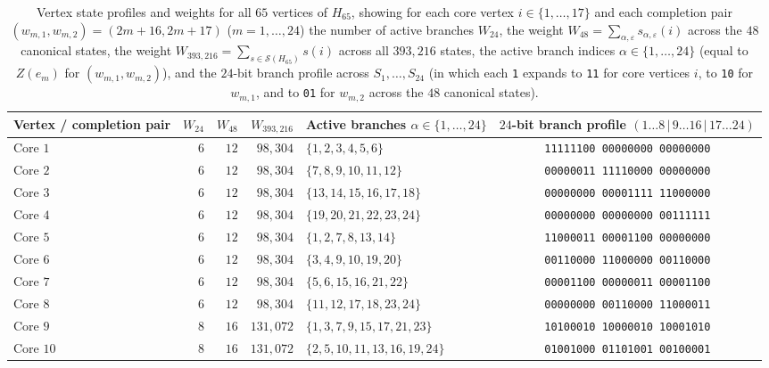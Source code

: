 \documentclass[
  aps,
  pra,
  reprint,
  superscriptaddress,
  amsmath,
  amssymb,
  nofootinbib,
  floatfix
]{revtex4-2}
\theoremstyle{definition}
\theoremstyle{remark}
\begin{document}
\begin{table}[t]
\caption{Vertex state profiles and weights for all $65$ vertices of $H_{65}$, showing for each core vertex $i\in\{1,\ldots,17\}$ and each completion pair $(w_{m,1},w_{m,2})=(2m+16,2m+17)$ ($m=1,\ldots,24$) the number of active branches $W_{24}$, the weight $W_{48}=\sum_{\alpha,\varepsilon}s_{\alpha,\varepsilon}(i)$ across the $48$ canonical states, the weight $W_{393{,}216}=\sum_{s\in\mathcal{S}(H_{65})}s(i)$ across all $393{,}216$ states, the active branch indices $\alpha\in\{1,\ldots,24\}$ (equal to $Z(e_m)$ for $(w_{m,1},w_{m,2})$), and the $24$-bit branch profile across $S_1,\ldots,S_{24}$ (in which each \texttt{1} expands to \texttt{11} for core vertices $i$, to \texttt{10} for $w_{m,1}$, and to \texttt{01} for $w_{m,2}$ across the $48$ canonical states).}\label{tab:app-h65-vertex-profiles}
\scriptsize
\begin{ruledtabular}
\begin{tabular}{lrrrlc}
Vertex / completion pair & $W_{24}$ & $W_{48}$ & $W_{393{,}216}$ & Active branches $\alpha\in\{1,\ldots,24\}$ & $24$-bit branch profile $(1\ldots 8\,|\,9\ldots 16\,|\,17\ldots 24)$ \\ \hline
Core $1$ & $6$ & $12$ & $98{,}304$ & $\{1,2,3,4,5,6\}$ & \texttt{11111100\,00000000\,00000000} \\
Core $2$ & $6$ & $12$ & $98{,}304$ & $\{7,8,9,10,11,12\}$ & \texttt{00000011\,11110000\,00000000} \\
Core $3$ & $6$ & $12$ & $98{,}304$ & $\{13,14,15,16,17,18\}$ & \texttt{00000000\,00001111\,11000000} \\
Core $4$ & $6$ & $12$ & $98{,}304$ & $\{19,20,21,22,23,24\}$ & \texttt{00000000\,00000000\,00111111} \\
Core $5$ & $6$ & $12$ & $98{,}304$ & $\{1,2,7,8,13,14\}$ & \texttt{11000011\,00001100\,00000000} \\
Core $6$ & $6$ & $12$ & $98{,}304$ & $\{3,4,9,10,19,20\}$ & \texttt{00110000\,11000000\,00110000} \\
Core $7$ & $6$ & $12$ & $98{,}304$ & $\{5,6,15,16,21,22\}$ & \texttt{00001100\,00000011\,00001100} \\
Core $8$ & $6$ & $12$ & $98{,}304$ & $\{11,12,17,18,23,24\}$ & \texttt{00000000\,00110000\,11000011} \\
Core $9$ & $8$ & $16$ & $131{,}072$ & $\{1,3,7,9,15,17,21,23\}$ & \texttt{10100010\,10000010\,10001010} \\
Core $10$ & $8$ & $16$ & $131{,}072$ & $\{2,5,10,11,13,16,19,24\}$ & \texttt{01001000\,01101001\,00100001} \\

\end{tabular}
\end{ruledtabular}
\end{table}
\end{document}
